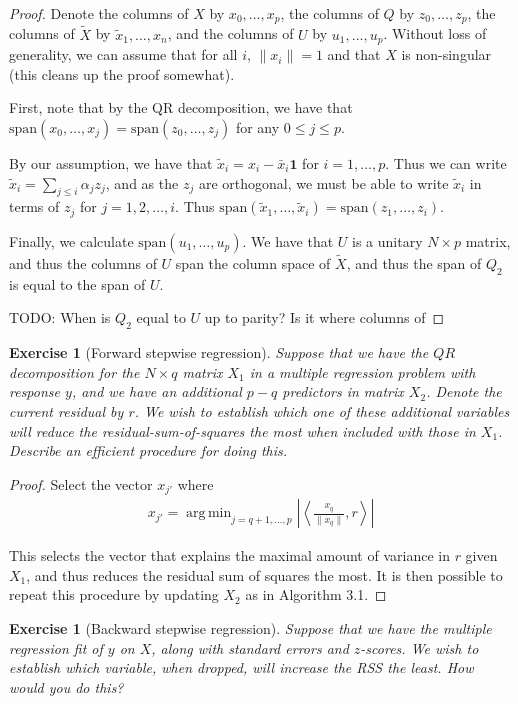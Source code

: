 \documentclass[12pt]{amsart}
\theoremstyle{plain}%
\newtheorem{exer}[thm]{Exercise}
\theoremstyle{definition}
\theoremstyle{remark}
\DeclareMathOperator*{\argmin}{arg\,min}
\begin{document}
\begin{proof}
    Denote the columns of $X$ by $x_0, \dots, x_{p}$, the columns of $Q$ by $z_0, \dots, z_p$, the columns of $\tilde X$ by $\tilde x_1, \dots, x_n$, and the columns of $U$ by $u_1, \dots, u_p$.  Without loss of generality, we can assume that for all $i$, $\| x_i \| = 1$ and that $X$ is non-singular (this cleans up the proof somewhat).


    First, note that by the QR decomposition, we have that $\text{span}(x_0, \dots, x_j) = \text{span}(z_0, \dots, z_j)$ for any $0 \leq j \leq p$.  

    By our assumption, we have that $\tilde x_i = x_i - \bar x_i \mathbf{1}$ for $i = 1, \dots, p$.  Thus we can write $\tilde x_i = \sum_{j \leq i} \alpha_j z_j$, and as the $z_j$ are orthogonal, we must be able to write $\tilde x_i$ in terms of $z_j$ for $j = 1, 2, \dots, i$.  Thus $\text{span}(\tilde x_1, \dots, \tilde x_i) = \text{span}(z_1, \dots, z_i)$.  

    Finally, we calculate $\text{span}(u_1, \dots, u_p)$.  We have that $U$ is a unitary $N \times p$ matrix, and thus the columns of $U$ span the column space of $\tilde X$, and thus the span of $Q_2$ is equal to the span of $U$.  

    TODO: When is $Q_2$ equal to $U$ up to parity?  Is it where columns of 
\end{proof}
\begin{exer}[Forward stepwise regression]
    Suppose that we have the $QR$ decomposition for the $N \times q$ matrix $X_1$ in a multiple regression problem with response $y$, and we have an additional $p - q$ predictors in matrix $X_2$.  Denote the current residual by $r$.  We wish to establish which one of these additional variables will reduce the residual-sum-of-squares the most when included with those in $X_1$.  Describe an efficient procedure for doing this.
\end{exer}

\begin{proof}
    Select the vector $x_{j'}$ where
    \begin{align*}
        x_{j'} = \argmin_{j = q+1, \dots, p} \left| \left\langle \frac{x_q}{\| x_q \|}, r \right\rangle \right| 
    \end{align*}
    
    This selects the vector that explains the maximal amount of variance in $r$ given $X_1$, and thus reduces the residual sum of squares the most.  It is then possible to repeat this procedure by updating $X_2$ as in Algorithm 3.1.
\end{proof}
\begin{exer}[Backward stepwise regression]
    Suppose that we have the multiple regression fit of $y$ on $X$, along with standard errors and $z$-scores.  We wish to establish which variable, when dropped, will increase the RSS the least.  How would you do this?
\end{exer}
\end{document}

